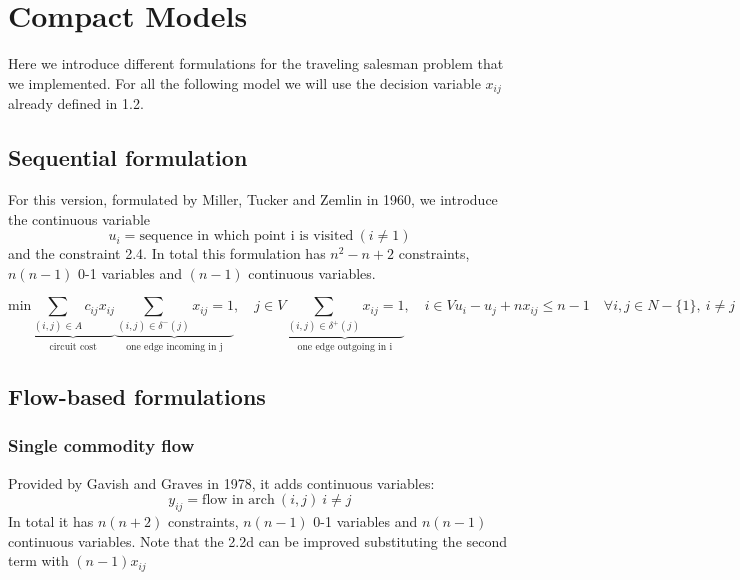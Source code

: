 \chapter{Compact Models}
Here we introduce different formulations for the traveling salesman problem that we implemented. For all the following model we will use the decision variable $x_{ij}$ already defined in 1.2.

\section{Sequential formulation}
For this version, formulated by Miller, Tucker and Zemlin in 1960, we introduce the continuous variable 
\begin{equation*}
	u_i = \text{sequence in which point i is visited} \ (i \neq 1)
\end{equation*}
and the constraint 2.4. In total this formulation has $n^2-n+2$ constraints, $n(n-1)$ 0-1 variables and $(n-1)$ continuous variables.

\begin{subequations}
	\begin{equation}
		\text{min} \underbrace{\sum_{(i,j) \in A} c_{ij}x_{ij}}_\text{circuit cost}
	\end{equation}
	\begin{equation}
		\underbrace{\sum_{(i,j) \in \delta^{-}(j)} x_{ij} = 1}_\text{one edge incoming in j}, \quad j \in V 
	\end{equation}
	\begin{equation}
		\underbrace{\sum_{(i,j) \in \delta^{+}(j)} x_{ij} = 1}_\text{one edge outgoing in i}, \quad i \in V
	\end{equation}
	\begin{equation}
		u_i-u_j+nx_{ij} \leq n-1 \quad \forall i,j \in N-\lbrace 1 \rbrace, \ i\neq j
	\end{equation}
\end{subequations}

\section{Flow-based formulations}

\subsection{Single commodity flow}
Provided by Gavish and Graves in 1978, it adds continuous variables: 
\begin{equation*}
	y_{ij} = \text{flow in arch} \ (i,j) \ i \neq j
\end{equation*}
In total it has $n(n+2)$ constraints, $n(n-1)$ 0-1 variables and $n(n-1)$ continuous variables.
Note that the 2.2d can be improved substituting the second term with $(n-1)x_{ij}$

